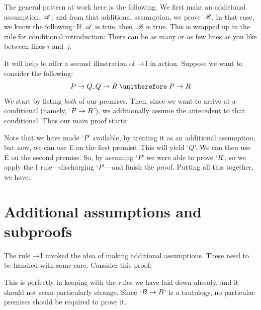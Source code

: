 The general pattern at work here is the following. We first make an additional assumption, $\mathscr{A}$; and from that additional assumption, we prove~$\mathscr{B}$. In that case, we know the following: If~$\mathscr{A}$ is true, then~$\mathscr{B}$ is true. This is wrapped up in the rule for conditional introduction:
There can be as many or as few lines as you like between lines $i$
and~$j$.

It will help to offer a second  illustration of $\rightarrow$I in action. Suppose we want to consider the following:
	$$P \eif Q, Q \eif R \therefore P \eif R$$
We start by listing \emph{both} of our premises. Then, since we want to arrive at a conditional (namely, `$P \rightarrow R$'), we additionally assume the antecedent to that conditional. Thus our main proof starts:
\begin{fitchproof}
	\PR
	\PR
	\open
		\AS
	\close
\end{fitchproof}
Note that we have made `$P$' available, by treating it as an additional assumption, but now, we can use {\eif}E on the first premise. This will yield `$Q$'. We can then use {\eif}E on the second premise. So, by assuming `$P$' we were able to prove `$R$', so we apply the {\eif}I rule---discharging `$P$'---and finish the proof. Putting all this together, we have:
\label{HSproof}
\begin{fitchproof}
	\PR
	\PR
	\open
		\AS
	\close
\end{fitchproof}


\section{Additional assumptions and subproofs}
The rule $\rightarrow$I invoked the idea of making additional assumptions. These need to be handled with some care. Consider this proof:
\begin{fitchproof}
	\PR
	\open
		\AS
		 
	\close
\end{fitchproof}
This is perfectly in keeping with the rules we have laid down already, and it should not seem particularly strange. Since `$B \rightarrow B$' is a tautology, no particular premises should be required to prove it.

